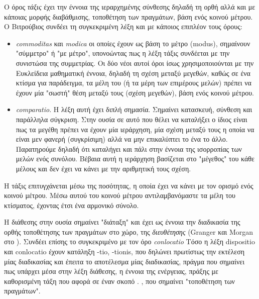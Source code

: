 \begin{description}[style=nextline]
\item[Ordinatio]
  
Ο όρος \emph{τάξις} έχει την έννοια της ιεραρχημένης σύνθεσης δηλαδή τη ορθή αλλά και με κάποιας μορφής διαβάθμισης, τοποθέτηση των πραγμάτων, βάση ενός κοινού μέτρου. Ο Βιτρούβιος συνδέει τη συγκεκριμένη λέξη και με κάποιος επιπλέον τους όρους:

\begin{itemize}[noitemsep]
\item \emph{commoditas} και \emph{modica} οι οποίες έχουν ως βάση το μέτρο 
(modus), σημαίνουν "σύμμετρο" ή "με μέτρο", υπονοώντας πως η λέξη τάξις 
συνδέεται με την συνιστώσα της συμμετρίας. Οι δύο νέοι αυτοί όροι ίσως 
χρησιμοποιούνται με την Ευκλείδεια μαθηματική έννοια, δηλαδή τη σχέση μεταξύ 
μεγεθών, καθώς σε ένα κτίσμα για παράδειγμα, τα μέλη του (ή τα μέρη των 
επιμέρους μελών) πρέπει να έχουν μία "σωστή" θέση μεταξύ τους (σχέση μεγεθών), 
βάση ενός κοινού μέτρου.


\item \emph{comparatio}. Η λέξη αυτή έχει διπλή σημασία. Σημαίνει κατασκευή, 
σύνθεση και παράλληλα σύγκριση. Στην ουσία σε αυτό που θέλει να καταλήξει ο 
ίδιος είναι πως τα μεγέθη πρέπει να έχουν μία ιεράρχηση, μία σχέση μεταξύ τους 
η οποία να είναι μεν φανερή (συγκρίσιμη) αλλά να μην επικαλύπτει το ένα το 
άλλο. Παρατηρούμε δηλαδή ότι καταλήγει και πάλι στην έννοια της ισορροπίας των 
μελών ενός συνόλου. Βέβαια αυτή η ιεράρχηση βασίζεται στο "μέγεθος" του κάθε 
μέλους και δεν έχει να κάνει με την αριθμητική τους σχέση. 
\end{itemize}


Η τάξις επιτυγχάνεται μέσω της ποσότητας, η οποία έχει να κάνει με τον ορισμό ενός κοινού μέτρου. Μέσω αυτού του κοινού μέτρου αντιλαμβανόμαστε τα μέλη του κτίσματος, έχοντας έτσι ένα αρμονικό σύνολο. 

\item[Dispositio]
  
Η διάθεσης στην ουσία σημαίνει "διάταξη" και έχει ως έννοια την διαδικασία της 
ορθής τοποθέτησης των πραγμάτων στο χώρο, της \emph{διευθέτησης} (Granger και 
Morgan στο \cite[σ.~495]{scranton_vitruvius_1974}). Συνδέει επίσης το 
συγκεκριμένο με τον όρο \emph{conlocatio}\sidenote%
    {Τόσο η λέξη dispositio και conlocatio 
    έχουν κατάληξη -tio, -tionis, που δηλώνει
    πρωτίστως την εκτέλεση μίας διαδικασίας και
    έπειτα το αποτέλεσμα μίας διαδικασίας, πράγμα
    που σημαίνει πως υπάρχει μέσα στην λέξη
    διάθεσης, η έννοια της ενέργειας, πράξης
    με καθορισμένη τάξη που αφορά σε έναν σκοπό \cite[σ.~496]{scranton_vitruvius_1974}.}
, που σημαίνει "τοποθέτηση των πραγμάτων". 


\end{description}
